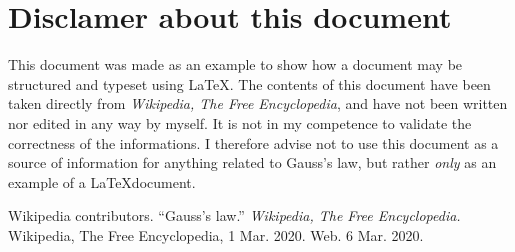 \documentclass[a4paper]{article}
\begin{document}
\appendix
\section{Disclamer about this document}
This document was made as an example to show how a document may be structured and typeset using \LaTeX. The contents of this document have been taken directly from \textit{Wikipedia, The Free Encyclopedia}, and have not been written nor edited in any way by myself. It is not in my competence to validate the correctness of the informations. I therefore advise not to use this document as a source of information for anything related to Gauss's law, but rather \emph{only} as an example of a \LaTeX document.


\begin{thebibliography}{1}
     Wikipedia contributors.
        ``Gauss's law.''
        \textit{Wikipedia, The Free Encyclopedia.}
        Wikipedia, The Free Encyclopedia, 1 Mar. 2020. Web. 6 Mar. 2020. 
\end{thebibliography}
\end{document}
